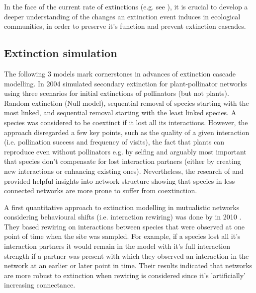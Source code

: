 \documentclass[12pt,a4paper]{article}
\begin{document}


In the face of the current rate of extinctions (e.g. see \cite{IPBES2019}), it is crucial to develop a deeper understanding of the changes an extinction event induces in ecological communities, in order to preserve it's function and prevent extinction cascades. 
\subsection{Extinction simulation}
The following 3 models mark cornerstones in advances of extinction cascade modelling. In 2004 \citeauthor{Memmott2004} simulated secondary extinction for plant-pollinator networks using three scenarios for initial extinctions of pollinators (but not plants). Random extinction (Null model), sequential removal of species starting with the most linked, and sequential removal starting with the least linked species. A species was considered to be coextinct if it lost all its interactions. However, the approach disregarded a few key points, such as the quality of a given interaction (i.e. pollination success and frequency of visits), the fact that plants can reproduce even without pollinators e.g. by selfing and arguably most important that species don't compensate for lost interaction partners (either by creating new interactions or enhancing existing ones). Nevertheless, the research of \citeauthor{Dunne2002} and \citeauthor{Memmott2004} provided helpful insights into network structure showing that species in less connected networks are more prone to suffer from coextinction. \par

A first quantitative approach to extinction modelling in mutualistic networks considering behavioural shifts (i.e. interaction rewiring) was done by \citeauthor{Kaiser-Bunbury2010} in 2010 \parencite{Kaiser-Bunbury2010}. They based rewiring on interactions between species that were observed at one point of time when the site was sampled. For example, if a species lost all it's interaction partners it would remain in the model with it's full interaction strength if a partner was present with which they observed an interaction in the network at an earlier or later point in time. Their results indicated that networks are more robust to extinction when rewiring is considered since it's 'artificially' increasing connectance. \par
\end{document}
